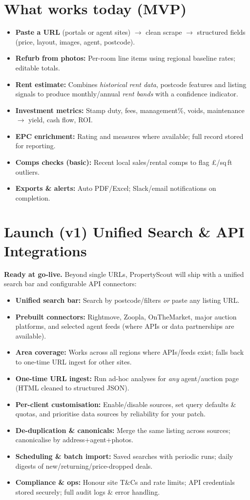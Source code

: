 \documentclass[11pt,a4paper]{article}
\newcommand{\product}{PropertyScout}
\begin{document}
\section*{What works today (MVP)}
\begin{itemize}
  \item \textbf{Paste a URL} (portals or agent sites) $\rightarrow$ clean scrape $\rightarrow$ structured fields (price, layout, images, agent, postcode).
  \item \textbf{Refurb from photos:} Per-room line items using regional baseline rates; editable totals.
  \item \textbf{Rent estimate:} Combines \emph{historical rent data}, postcode features and listing signals to produce monthly/annual \emph{rent bands} with a confidence indicator.
  \item \textbf{Investment metrics:} Stamp duty, fees, management\%, voids, maintenance $\rightarrow$ yield, cash flow, ROI.
  \item \textbf{EPC enrichment:} Rating and measures where available; full record stored for reporting.
  \item \textbf{Comps checks (basic):} Recent local sales/rental comps to flag \pounds/sq\,ft outliers.
  \item \textbf{Exports \& alerts:} Auto PDF/Excel; Slack/email notifications on completion.
\end{itemize}

\section*{Launch (v1) Unified Search \& API Integrations}
\textbf{Ready at go-live.} Beyond single URLs, \product{} will ship with a unified search bar and configurable API connectors:
\begin{itemize}
  \item \textbf{Unified search bar:} Search by postcode/filters \emph{or} paste any listing URL.
  \item \textbf{Prebuilt connectors:} Rightmove, Zoopla, OnTheMarket, major auction platforms, and selected agent feeds (where APIs or data partnerships are available).
  \item \textbf{Area coverage:} Works across all regions where APIs/feeds exist; falls back to one-time URL ingest for other sites.
  \item \textbf{One-time URL ingest:} Run ad-hoc analyses for \emph{any} agent/auction page (HTML cleaned to structured JSON).
  \item \textbf{Per-client customisation:} Enable/disable sources, set query defaults \& quotas, and prioritise data sources by reliability for your patch.
  \item \textbf{De-duplication \& canonicals:} Merge the same listing across sources; canonicalise by address+agent+photos.
  \item \textbf{Scheduling \& batch import:} Saved searches with periodic runs; daily digests of new/returning/price-dropped deals.
  \item \textbf{Compliance \& ops:} Honour site T\&Cs and rate limits; API credentials stored securely; full audit logs \& error handling.
\end{itemize}
\end{document}
